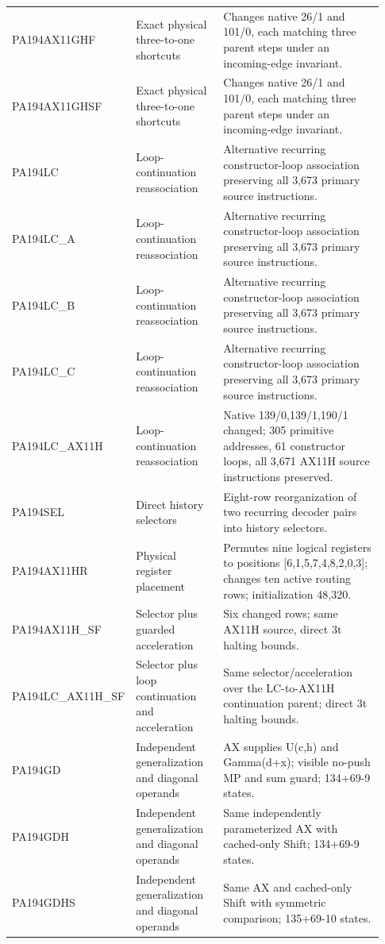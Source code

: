 \begin{longtable}{>{\raggedright\arraybackslash}p{0.23\linewidth}>{\raggedright\arraybackslash}p{0.24\linewidth}>{\raggedright\arraybackslash}p{0.46\linewidth}}
PA194AX11GHF&Exact physical three-to-one shortcuts&Changes native 26/\allowbreak{}1 and 101/\allowbreak{}0, each matching three parent steps under an incoming-edge invariant.\\[5pt]
PA194AX11GHSF&Exact physical three-to-one shortcuts&Changes native 26/\allowbreak{}1 and 101/\allowbreak{}0, each matching three parent steps under an incoming-edge invariant.\\[5pt]
PA194LC&Loop-continuation reassociation&Alternative recurring constructor-loop association preserving all 3,673 primary source instructions.\\[5pt]
PA194LC\_A&Loop-continuation reassociation&Alternative recurring constructor-loop association preserving all 3,673 primary source instructions.\\[5pt]
PA194LC\_B&Loop-continuation reassociation&Alternative recurring constructor-loop association preserving all 3,673 primary source instructions.\\[5pt]
PA194LC\_C&Loop-continuation reassociation&Alternative recurring constructor-loop association preserving all 3,673 primary source instructions.\\[5pt]
PA194LC\_AX11H&Loop-continuation reassociation&Native 139/\allowbreak{}0,139/\allowbreak{}1,190/\allowbreak{}1 changed; 305 primitive addresses, 61 constructor loops, all 3,671 AX11H source instructions preserved.\\[5pt]
PA194SEL&Direct history selectors&Eight-row reorganization of two recurring decoder pairs into history selectors.\\[5pt]
PA194AX11HR&Physical register placement&Permutes nine logical registers to positions [6,1,5,7,4,8,2,0,3]; changes ten active routing rows; initialization 48,320.\\[5pt]
PA194AX11H\_SF&Selector plus guarded acceleration&Six changed rows; same AX11H source, direct 3t halting bounds.\\[5pt]
PA194LC\_AX11H\_SF&Selector plus loop continuation and acceleration&Same selector/\allowbreak{}acceleration over the LC-to-AX11H continuation parent; direct 3t halting bounds.\\[5pt]
PA194GD&Independent generalization and diagonal operands&AX supplies U(c,h) and Gamma(d+x); visible no-push MP and sum guard; 134+69-9 states.\\[5pt]
PA194GDH&Independent generalization and diagonal operands&Same independently parameterized AX with cached-only Shift; 134+69-9 states.\\[5pt]
PA194GDHS&Independent generalization and diagonal operands&Same AX and cached-only Shift with symmetric comparison; 135+69-10 states.\\[5pt]

\end{longtable}
